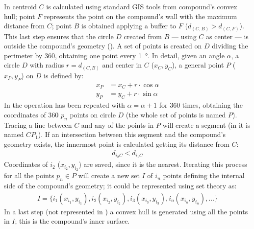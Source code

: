             In  centroid $C$ is calculated using standard GIS tools from compound's convex hull; point $F$ represents the point on the compound's wall with the maximum distance from $C$; point $B$ is obtained applying a buffer to $F$ ($d_{(C,B)} > d_{(C,F)}$). This last step ensures that the circle $D$ created from $B$ --- using $C$ as center --- is outside the compound's geometry (). A set of points is created on $D$ dividing the perimeter by 360, obtaining one point every \SI{1}{\degree}. In detail, given an angle $\alpha$, a circle $D$ with radius $r=d_{(C,B)}$ and center in $C$ ($x_C, y_C$), a general point $P$ ($x_P, y_P$) on $D$ is defined by:
            \begin{align}
                \label{eq:point-circle}
                x_P &= x_C + r\cdot\cos\alpha\\
                y_P &= y_C + r\cdot\sin\alpha
            \end{align}
            In  the operation has been repeated with $\alpha=\alpha+1$ for 360 times, obtaining the coordinates of 360 $p_n$ points on circle $D$ (the whole set of points is named $P$). Tracing a line between $C$ and any of the points in $P$ will create a segment (in  it is named $CP_1$). If an intersection between this segment and the compound's geometry exists, the innermost point is calculated getting its distance from $C$:
            \begin{align}
                \label{eq:innerpoint}
                d_{i_2 C} < d_{i_1 C}
            \end{align}
            Coordinates of $i_2$ ($x_{i_2}, y_{i_2}$) are saved, since it is the nearest. Iterating this process for all the points $p_n\in P$ will create a new set $I$ of $i_n$ points defining the internal side of the compound's geometry; it could be represented using set theory \cite{molenaar2003} as:
            \begin{align}
                \label{inter-set}
                I = \{ i_1 (x_{i_1}, y_{i_1}), i_2 (x_{i_2}, y_{i_2}), i_3 (x_{i_3}, y_{i_3}), i_n (x_{i_n}, y_{i_n}), \ldots \}
            \end{align}
            In a last step (not represented in ) a convex hull is generated using all the points in $I$; this is the compound's inner surface.

